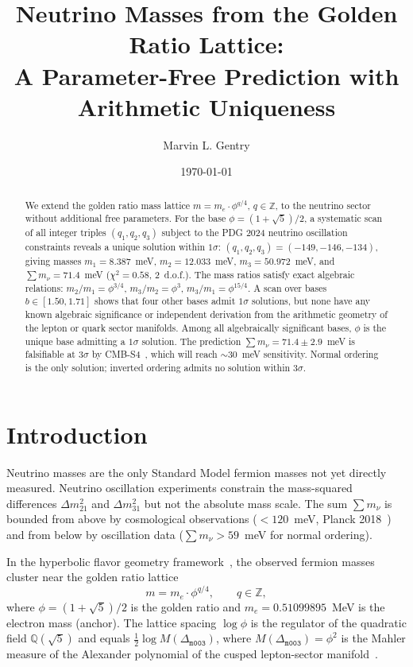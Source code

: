 \documentclass[12pt]{article}
\title{Neutrino Masses from the Golden Ratio Lattice:\\
A Parameter-Free Prediction with Arithmetic Uniqueness}
\author[1]{Marvin L. Gentry}
\affil[1]{Independent Researcher, \texttt{drmlgentry@protonmail.com}\\
ORCID: 0009-0006-4550-2663}
\date{\today}
\theoremstyle{definition}
\begin{document}
\maketitle

\begin{abstract}
We extend the golden ratio mass lattice $m = m_e \cdot \phi^{q/4}$,
$q \in \mathbb{Z}$, to the neutrino sector without additional free
parameters. For the base $\phi = (1+\sqrt5)/2$, a systematic scan of
all integer triples $(q_1, q_2, q_3)$ subject to the PDG 2024 neutrino
oscillation constraints reveals a unique solution within $1\sigma$:
$(q_1, q_2, q_3) = (-149, -146, -134)$, giving masses
$m_1 = 8.387$~meV, $m_2 = 12.033$~meV, $m_3 = 50.972$~meV,
and $\sum m_\nu = 71.4$~meV ($\chi^2 = 0.58$, 2~d.o.f.).
The mass ratios satisfy exact algebraic relations:
$m_2/m_1 = \phi^{3/4}$, $m_3/m_2 = \phi^3$, $m_3/m_1 = \phi^{15/4}$.
A scan over bases $b\in[1.50,1.71]$ shows that four other bases admit
$1\sigma$ solutions, but none have any known algebraic significance
or independent derivation from the arithmetic geometry of the lepton
or quark sector manifolds. Among all algebraically significant bases,
$\phi$ is the unique base admitting a $1\sigma$ solution.
The prediction $\sum m_\nu = 71.4 \pm 2.9$~meV is falsifiable at
$3\sigma$ by CMB-S4~\cite{CMBS4}, which will reach $\sim 30$~meV
sensitivity. Normal ordering is the only solution; inverted ordering
admits no solution within $3\sigma$.
\end{abstract}

\section{Introduction}
\label{sec:intro}

Neutrino masses are the only Standard Model fermion masses not yet
directly measured. Neutrino oscillation experiments constrain the
mass-squared differences $\Delta m^2_{21}$ and $\Delta m^2_{31}$
but not the absolute mass scale. The sum $\sum m_\nu$ is bounded
from above by cosmological observations ($< 120$~meV, Planck
2018~\cite{Planck2018}) and from below by oscillation data
($\sum m_\nu > 59$~meV for normal ordering).

In the hyperbolic flavor geometry framework~\cite{Gentry:CORE}, the
observed fermion masses cluster near the golden ratio lattice
\begin{equation}
  m = m_e \cdot \phi^{q/4}, \qquad q \in \mathbb{Z},
  \label{eq:lattice}
\end{equation}
where $\phi = (1+\sqrt{5})/2$ is the golden ratio and $m_e =
0.51099895$~MeV is the electron mass (anchor). The lattice spacing
$\log\phi$ is the regulator of the quadratic field $\mathbb{Q}(\sqrt{5})$
and equals $\tfrac{1}{2}\log M(\Delta_{\texttt{m003}})$, where
$M(\Delta_{\texttt{m003}}) = \phi^2$ is the Mahler measure of the
Alexander polynomial of the cusped lepton-sector
manifold~\cite{Gentry:JKTR}.
\end{document}
